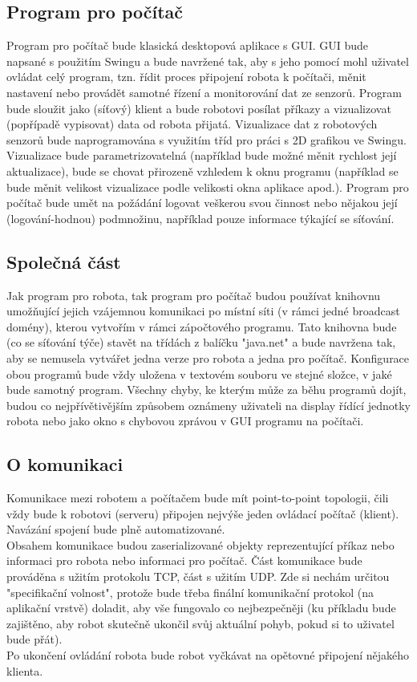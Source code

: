 \documentclass[12pt, ngerman]{article}
\begin{document}
\subsection{Program pro počítač}
Program pro počítač bude klasická desktopová aplikace s GUI. GUI bude napsané s použitím Swingu a bude navržené tak, aby s jeho pomocí mohl uživatel ovládat celý program, tzn. řídit proces připojení robota k počítači, měnit nastavení nebo provádět samotné řízení a monitorování dat ze senzorů. Program bude sloužit jako (síťový) klient a bude robotovi posílat příkazy a vizualizovat (popřípadě vypisovat) data od robota přijatá. Vizualizace dat z robotových senzorů bude naprogramována s využitím tříd pro práci s 2D grafikou ve Swingu. Vizualizace bude parametrizovatelná (například bude možné měnit rychlost její aktualizace), bude se chovat přirozeně vzhledem k oknu programu (například se bude měnit velikost vizualizace podle velikosti okna aplikace apod.). Program pro počítač bude umět na požádání logovat veškerou svou činnost nebo nějakou její (logování-hodnou) podmnožinu, například pouze informace týkající se síťování.

\subsection{Společná část}
Jak program pro robota, tak program pro počítač budou používat knihovnu umožňující jejich vzájemnou komunikaci po místní síti (v rámci jedné broadcast domény), kterou vytvořím v rámci zápočtového programu. Tato knihovna bude (co se síťování týče) stavět na třídách z balíčku "java.net" a bude navržena tak, aby se nemusela vytvářet jedna verze pro robota a jedna pro počítač. Konfigurace obou programů bude vždy uložena v textovém souboru ve stejné složce, v jaké bude samotný program. Všechny chyby, ke kterým může za běhu programů dojít, budou co nejpřívětivějším způsobem oznámeny uživateli na display řídící jednotky robota nebo jako okno s chybovou zprávou v GUI programu na počítači.

\subsection{O komunikaci}
Komunikace mezi robotem a počítačem bude mít point-to-point topologii, čili vždy bude k robotovi (serveru) připojen nejvýše jeden ovládací počítač (klient).\\
Navázání spojení bude plně automatizované. \\
Obsahem komunikace budou zaserializované objekty reprezentující příkaz nebo informaci pro robota nebo informaci pro počítač. Část komunikace bude prováděna s užitím protokolu TCP, část s užitím UDP. Zde si nechám určitou "specifikační volnost", protože bude třeba finální komunikační protokol (na aplikační vrstvě) doladit, aby vše fungovalo co nejbezpečněji (ku příkladu bude zajištěno, aby robot skutečně ukončil svůj aktuální pohyb, pokud si to uživatel bude přát).\\
Po ukončení ovládání robota bude robot vyčkávat na opětovné připojení nějakého klienta.
\end{document}
